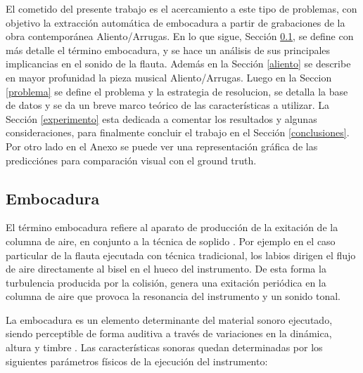 \documentclass{article}
\begin{document}
El cometido del presente trabajo es el acercamiento a este tipo de problemas, con objetivo la extracción automática de embocadura a partir de grabaciones de la obra contemporánea Aliento/Arrugas. En lo que sigue, Sección \ref{embocadura}, se define con más detalle el término embocadura, y se hace un análisis de sus principales implicancias en el sonido de la flauta. Además en la Sección \ref{aliento} se describe en mayor profunidad la pieza musical Aliento/Arrugas. Luego en la Seccion \ref{problema} se define el problema y la estrategia de resolucion, se detalla la base de datos y se da un breve marco teórico de las características a utilizar. La Sección \ref{experimento} esta dedicada a comentar los resultados y algunas consideraciones, para finalmente concluir el trabajo en el Sección \ref{conclusiones}. Por otro lado en el Anexo se puede ver una representación gráfica de las predicciónes para comparación visual con el ground truth.

\subsection{Embocadura}
\label{embocadura}
El término embocadura refiere al aparato de producción de la exitación de la columna de aire, en conjunto a la técnica de soplido \citep[Capítulo~6]{piston1955orchestration}. Por ejemplo en el caso particular de la flauta ejecutada con técnica tradicional, los labios dirigen el flujo de aire directamente al bisel en el hueco del instrumento. De esta forma la turbulencia producida por la colisión, genera una exitación periódica en la columna de aire que provoca la resonancia del instrumento y un sonido tonal. 
\medskip

La embocadura es un elemento determinante del material sonoro ejecutado, siendo perceptible de forma auditiva a través de variaciones en la dinámica, altura y timbre \citep[Capítulo~2]{dick1975other}. Las características sonoras quedan determinadas por los siguientes parámetros físicos de la ejecución del instrumento:
\end{document}
